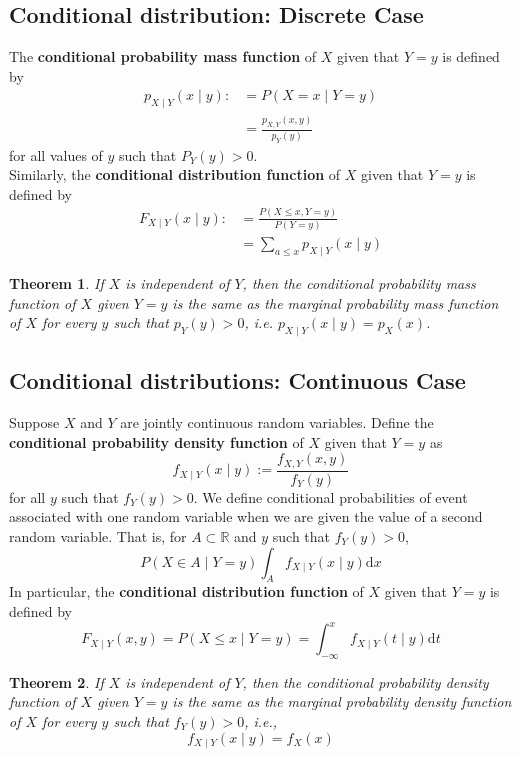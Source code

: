 \documentclass[12pt]{article}
\newcommand{\diff}{\mathrm{d}}
\newtheorem{theorem}{Theorem}[section]
\theoremstyle{definition}
\begin{document}
\subsection{Conditional distribution: Discrete Case}
The \textbf{conditional probability mass function} of $X$ given that $Y=y$ is defined by
\[
\begin{aligned}
p_{X\mid Y}(x\mid y):&=P(X=x\mid Y=y)\\
&=\frac{p_{X,Y}(x,y)}{p_Y(y)}
\end{aligned}
\]
for all values of $y$ such that $P_Y(y)>0$.\\
Similarly, the \textbf{conditional distribution function} of $X$ given that $Y=y$ is defined by
\[
\begin{aligned}
F_{X\mid Y}(x\mid y) :&=\frac{P(X\leq x, Y=y)}{P(Y=y)}\\
&= \sum_{a\leq x}p_{X\mid Y}(x\mid y)
\end{aligned}
\]
\begin{theorem}\normalfont If $X$ is independent of $Y$, then the conditional probability mass function of $X$ given $Y=y$ is the same as the marginal probability mass function of $X$ for every $y$ such that $p_Y(y)>0$, i.e. $p_{X\mid Y}(x\mid y) = p_X(x)$.
\end{theorem}
\subsection{Conditional distributions: Continuous Case}
Suppose $X$ and $Y$ are jointly continuous random variables. Define the \textbf{conditional probability density function} of $X$ given that $Y=y$ as
\[
f_{X\mid Y}(x\mid y):=\frac{f_{X,Y}(x,y)}{f_Y(y)}
\]
for all $y$ such that $f_Y(y)>0$.
We define conditional probabilities of event associated with one random variable when we are given the value of a second random variable.
That is, for $A\subset \mathbb{R}$ and $y$ such that $f_Y(y)>0$,
\[
P(X\in A\mid Y=y)\int_A f_{X\mid Y}(x\mid y)\diff x
\]
In particular, the \textbf{conditional distribution function} of $X$ given that $Y=y$ is defined by
\[
F_{X\mid Y}(x,y)=P(X\leq x\mid Y=y)=\int_{-\infty}^xf_{X\mid Y}(t\mid y)\diff t
\]
\begin{theorem}\normalfont If $X$ is independent of $Y$, then the conditional probability density function of $X$ given $Y=y$ is the same as the marginal probability density function of $X$ for every $y$ such that $f_Y(y)>0$, i.e.,
\[
f_{X\mid Y}(x\mid y)=f_X(x)
\]
\end{theorem}
\end{document}
